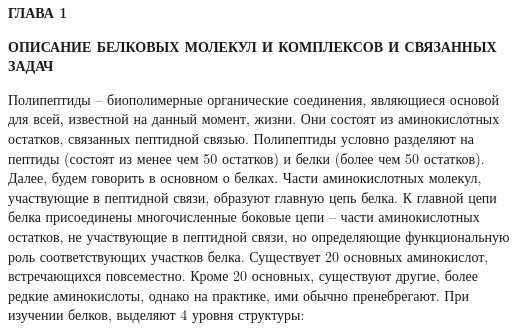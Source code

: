 \newpage
\begin{center}
	\textbf{\large ГЛАВА 1}

	\textbf{\large ОПИСАНИЕ БЕЛКОВЫХ МОЛЕКУЛ И КОМПЛЕКСОВ И СВЯЗАННЫХ ЗАДАЧ}
\end{center}


Полипептиды – биополимерные органические соединения, являющиеся основой для всей, известной на данный момент, жизни. Они состоят из аминокислотных остатков, связанных пептидной связью. Полипептиды условно разделяют на пептиды (состоят из менее чем 50 остатков) и белки (более чем 50 остатков). Далее, будем говорить в основном о белках. Части аминокислотных молекул, участвующие в пептидной связи, образуют главную цепь белка. К главной цепи белка присоединены многочисленные боковые цепи – части аминокислотных остатков, не участвующие в пептидной связи, но определяющие функциональную роль соответствующих участков белка. Существует 20 основных аминокислот, встречающихся повсеместно. Кроме 20 основных, существуют другие, более редкие аминокислоты, однако на практике, ими обычно пренебрегают. При изучении белков, выделяют 4 уровня структуры:

